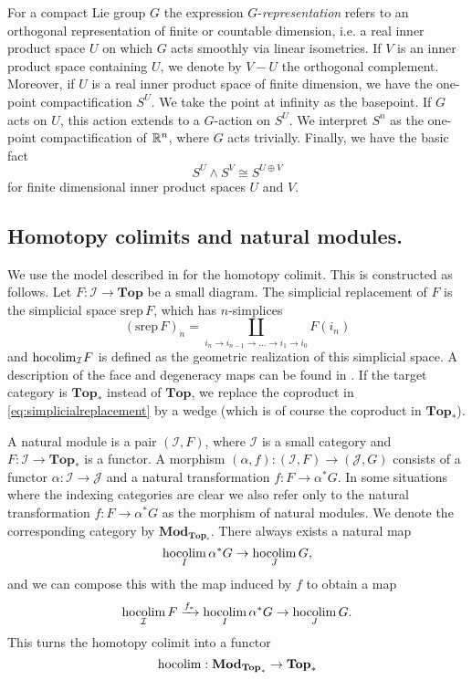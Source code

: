 For a compact Lie group $G$ the expression $G$-\textit{representation} refers to
an orthogonal representation of finite or countable dimension, i.e. a real inner product
space $U$ on which $G$ acts smoothly via linear isometries. If $V$ is an inner product
space containing $U$, we denote by $V-U$ the orthogonal complement.
Moreover, if $U$ is a real inner product space of finite dimension, we have the
one-point compactification $S^U$. We take the point at infinity as the basepoint.
If $G$ acts on $U$, this action extends to a $G$-action
on $S^U$. We interpret $S^n$ as the one-point compactification
of $\mathbb{R}^n$, where $G$ acts trivially. Finally, we have the basic fact 
\[
S^U\wedge S^V\cong S^{U\oplus V}
\]
for finite dimensional inner product spaces $U$ and $V$.

\subsection*{Homotopy colimits and natural modules.}
\label{sec:naturalmodules}
We use the model described in \cite{duggerhocolim} for the homotopy colimit.
This is constructed as follows. Let $F:\mathcal{I}\to \mathbf{Top}$ be a small diagram.
The simplicial replacement of $F$ is the simplicial space $\mathrm{srep}\, F$,
which has $n$-simplices
\begin{equation}\label{eq:simplicialreplacement}
(\mathrm{srep}\, F)_n = \coprod_{i_n\to i_{n-1}\to\ldots\to i_1\to i_0} F(i_n)
\end{equation}
and $\mathrm{hocolim}_{\mathcal{I}} F$ is defined as the geometric realization of this
simplicial space. A description of the face and degeneracy maps can be found
in \cite[\pno~16]{duggerhocolim}. If the target category is $\mathbf{Top}_\ast$ instead
of $\mathbf{Top}$, we replace the coproduct in \eqref{eq:simplicialreplacement}
by a wedge (which is of course the coproduct in $\mathbf{Top}_\ast$).

A natural module is a pair $(\mathcal{I}, F)$, where $\mathcal{I}$ is a small category
and $F:\mathcal{I} \to \mathbf{Top}_\ast$ is a functor. A morphism $(\alpha, f):(\mathcal{I}, F)
\to (\mathcal{J}, G)$ consists of a functor $\alpha:\mathcal{I}\to \mathcal{J}$
and a natural transformation $f:F\to \alpha^\ast G$. In some situations where the indexing
categories are clear we also refer only to the natural transformation $f:F\to \alpha^\ast G$
as the morphism of natural modules. We denote the corresponding
category by $\mathbf{Mod}_{\mathbf{Top}_\ast}$.
There always exists a natural map
\[
\underset{I}{\mathrm{hocolim}} \, \alpha^\ast G\to \underset{J}{\mathrm{hocolim}} \,  G,
\]
and we can compose this with the map induced by $f$ to obtain
a map
\[
\underset{\mathcal{I}}{\mathrm{hocolim}}\, F \xrightarrow{f_\ast}\underset{I}{\mathrm{hocolim}} \, \alpha^\ast G\to \underset{J}{\mathrm{hocolim}} \,  G.
\]
This turns the homotopy colimit into a functor
\[
\mathrm{hocolim}: \mathbf{Mod}_{\mathbf{Top}_\ast}\to \mathbf{Top}_\ast
\]
